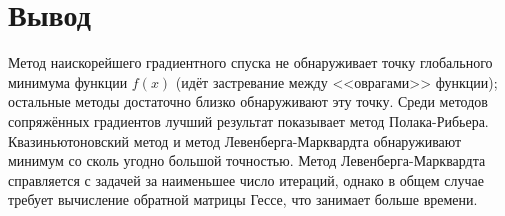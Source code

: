 \documentclass[a4paper, 14pt]{extarticle}
\begin{document}
\section{Вывод}

Метод наискорейшего градиентного спуска не обнаруживает точку глобального минимума функции $f(x)$
(идёт застревание между <<оврагами>> функции); остальные методы достаточно близко обнаруживают эту точку. Среди методов сопряжённых
градиентов лучший результат показывает метод Полака-Рибьера. Квазиньютоновский метод и метод Левенберга-Марквардта обнаруживают минимум
со сколь угодно большой точностью. Метод Левенберга-Марквардта справляется с задачей за наименьшее число итераций, однако в общем случае
требует вычисление обратной матрицы Гессе, что занимает больше времени.
\end{document}
